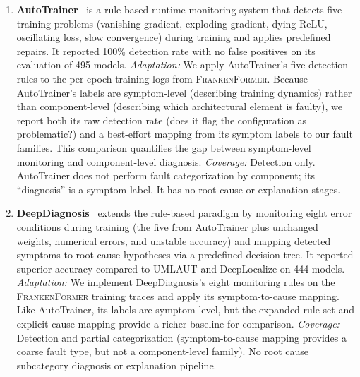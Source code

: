 \begin{enumerate}[label=(\roman*),nosep]
\item \textbf{AutoTrainer}~\cite{autotrainer} is a rule-based runtime monitoring system that detects five training problems (vanishing gradient, exploding gradient, dying ReLU, oscillating loss, slow convergence) during training and applies predefined repairs. It reported 100\% detection rate with no false positives on its evaluation of 495 models. \emph{Adaptation:} We apply AutoTrainer's five detection rules to the per-epoch training logs from \textsc{FrankenFormer}. Because AutoTrainer's labels are symptom-level (describing training dynamics) rather than component-level (describing which architectural element is faulty), we report both its raw detection rate (does it flag the configuration as problematic?) and a best-effort mapping from its symptom labels to our fault families. This comparison quantifies the gap between symptom-level monitoring and component-level diagnosis. \emph{Coverage:} Detection only. AutoTrainer does not perform fault categorization by component; its ``diagnosis'' is a symptom label. It has no root cause or explanation stages.

\item \textbf{DeepDiagnosis}~\cite{deepdiagnosis} extends the rule-based paradigm by monitoring eight error conditions during training (the five from AutoTrainer plus unchanged weights, numerical errors, and unstable accuracy) and mapping detected symptoms to root cause hypotheses via a predefined decision tree. It reported superior accuracy compared to UMLAUT and DeepLocalize on 444 models. \emph{Adaptation:} We implement DeepDiagnosis's eight monitoring rules on the \textsc{FrankenFormer} training traces and apply its symptom-to-cause mapping. Like AutoTrainer, its labels are symptom-level, but the expanded rule set and explicit cause mapping provide a richer baseline for comparison. \emph{Coverage:} Detection and partial categorization (symptom-to-cause mapping provides a coarse fault type, but not a component-level family). No root cause subcategory diagnosis or explanation pipeline.


\end{enumerate}
